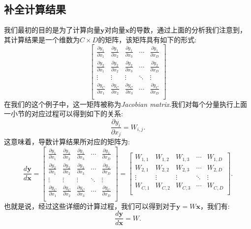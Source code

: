 \documentclass{ctexart}
\begin{document}
\subsection{补全计算结果}
我们最初的目的是为了计算向量$\mathbf{y}$对向量$\mathbf{x}$的导数，通过上面的分析我们注意到，其计算结果是一个维数为$C×D$的矩阵，该矩阵具有如下的形式:
\begin{equation*}
\left[
\begin{matrix}
\frac{\partial y_1}{\partial x_1} & \frac{\partial y_1}{\partial x_2} & \frac{\partial y_1}{\partial x_3} & \cdots & \frac{\partial y_1}{\partial x_D}\\
\frac{\partial y_2}{\partial x_1} & \frac{\partial y_2}{\partial x_2} & \frac{\partial y_2}{\partial x_3} & \cdots & \frac{\partial y_2}{\partial x_D}\\
\vdots & \vdots & \vdots & \ddots & \vdots\\
\frac{\partial y_C}{\partial x_1} & \frac{\partial y_C}{\partial x_2} & \frac{\partial y_C}{\partial x_3} & \cdots & \frac{\partial y_C}{\partial x_D}\\
\end{matrix}
\right]
\end{equation*}
在我们的这个例子中，这一矩阵被称为\textit{Jacobian matrix}.我们对每个分量执行上面一小节的对应过程可以得到如下的关系:
$$\frac{\partial{y_i}}{\partial{x_j}} = W_{i,j}.$$
这意味着，导数计算结果所对应的矩阵为:
\begin{equation*}
\frac{d \mathbf{y}}{d\mathbf{x}} =
\left[
\begin{matrix}
\frac{\partial y_1}{\partial x_1} & \frac{\partial y_1}{\partial x_2} & \frac{\partial y_1}{\partial x_3} & \cdots & \frac{\partial y_1}{\partial x_D}\\
\frac{\partial y_2}{\partial x_1} & \frac{\partial y_2}{\partial x_2} & \frac{\partial y_2}{\partial x_3} & \cdots & \frac{\partial y_2}{\partial x_D}\\
\vdots & \vdots & \vdots & \ddots & \vdots\\
\frac{\partial y_C}{\partial x_1} & \frac{\partial y_C}{\partial x_2} & \frac{\partial y_C}{\partial x_3} & \cdots & \frac{\partial y_C}{\partial x_D}\\
\end{matrix}
\right] = 
\left[
\begin{matrix}
W_{1,1} & W_{1,2} & W_{1,3} & \cdots & W_{1,D}\\
W_{2,1} & W_{2,2} & W_{2,3} & \cdots & W_{2,D}\\
\vdots & \vdots & \vdots & \ddots & \vdots\\
W_{C,1} & W_{C,2} & W_{C,3} & \cdots & W_{C,D}\\
\end{matrix}
\right].
\end{equation*}
也就是说，经过这些详细的计算过程，我们可以得到对于$\mathbf{y} = W\mathbf{x}$，我们有:
$$\frac{d \mathbf{y}}{d\mathbf{x}} =  W.$$
\end{document}
